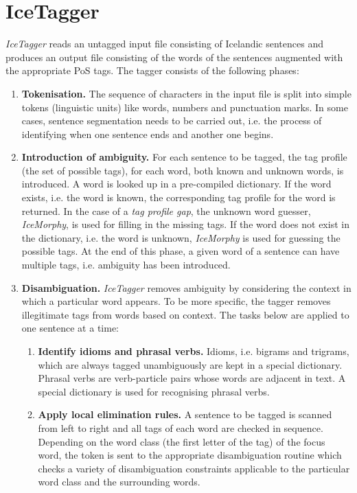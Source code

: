 \documentclass[11pt]{article}
\begin{document}
\section{IceTagger}
\label{sec:algorithm}
\emph{IceTagger} reads an untagged input file consisting of Icelandic sentences and produces an output file consisting of the words of the sentences augmented with the appropriate PoS tags.
The tagger consists of the following phases:
\begin{enumerate}
\item {\bf Tokenisation.}
The sequence of characters in the input file is split into simple tokens (linguistic units) like words, numbers and punctuation marks. In some cases, sentence segmentation needs to be carried out, i.e. the process of identifying when one sentence ends and another one begins.
\item {\bf Introduction of ambiguity.}
For each sentence to be tagged, the tag profile (the set of possible tags), for each word, both known and unknown words, is introduced.
A word is looked up in a pre-compiled dictionary. If the word exists, i.e. the word is known, the corresponding tag profile for the word is returned.
In the case of a \emph{tag profile gap}, the unknown word guesser, \emph{IceMorphy}, is used for filling in the missing tags.
If the word does not exist in the dictionary, i.e. the word is unknown, \emph{IceMorphy} is used for guessing the possible tags.
At the end of this phase, a given word of a sentence can have multiple tags, i.e. ambiguity has been introduced.
\item {\bf Disambiguation.}
\emph{IceTagger} removes ambiguity by considering the context in which a particular word appears.
To be more specific, the tagger removes illegitimate tags from words based on context.
The tasks below are applied to one sentence at a time:
\begin{enumerate}
\item {\bf Identify idioms and phrasal verbs.}
Idioms, i.e. bigrams and trigrams, which are always tagged unambiguously are kept in a special dictionary.
Phrasal verbs are verb-particle pairs whose words are adjacent in text.
A special dictionary is used for recognising phrasal verbs.
\item {\bf Apply local elimination rules.}
A sentence to be tagged is scanned from left to right and all tags of each word are checked in sequence.
Depending on the word class (the first letter of the tag) of the focus word, the token is sent to the appropriate disambiguation routine which checks a variety of disambiguation constraints applicable to the particular word class and the surrounding words.

\end{enumerate}
\end{enumerate}
\end{document}
